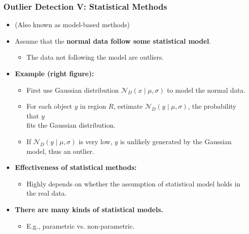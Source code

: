 \begin{frame}
  \frametitle{Outlier Detection V: Statistical Methods}
  \begin{itemize}
  \item (Also known as model-based methods)
  \item Assume that the \textbf{\color{airforceblue}normal data follow some statistical model}.
    \begin{itemize}
    \item The data not following the model are outliers.
    \end{itemize}
  \item \textbf{Example (right figure):}
    \begin{itemize}
    \item First use Gaussian distribution $\mathcal{N}_D(x \; \vert \; \mu,\sigma)$ to model the normal data.
    \item For each object $y$ in region $R$, estimate $\mathcal{N}_D(y \; \vert \; \mu, \sigma)$, the probability that $y$ \\
      fits the Gaussian distribution.
    \item If $\mathcal{N}_D(y \; \vert \; \mu, \sigma)$ is very low, $y$ is unlikely generated by the Gaussian model, thus an outlier.
    \end{itemize}
  \item\textbf{Effectiveness of statistical methods:}
    \begin{itemize}
    \item Highly depends on whether the assumption of statistical model holds in the real data.
    \end{itemize}
  \item \textbf{There are many kinds of statistical models.}
    \begin{itemize}
    \item E.g., parametric vs. non-parametric.
    \end{itemize}
  \end{itemize}


\end{frame}
